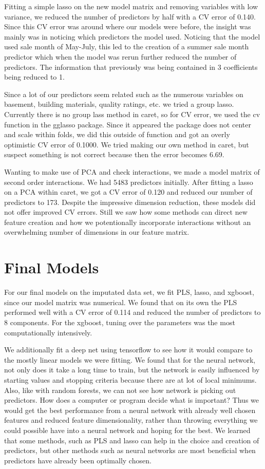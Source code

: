 \documentclass[12pt]{article}
\begin{document}
Fitting a simple lasso on the new model matrix and removing variables with low variance, we reduced the number of predictors by half with a CV error of 0.140.  Since this CV error was around where our models were before, the insight was mainly was in noticing which predictors the model used.  Noticing that the model used sale month of May-July, this led to the creation of a summer sale month predictor which when the model was rerun further reduced the number of predictors.  The information that previously was being contained in 3 coefficients being reduced to 1.

Since a lot of our predictors seem related such as the numerous variables on basement, building materials, quality ratings, etc. we tried a group lasso.  Currently there is no group lass method in caret, so for CV error, we used the cv function in the gglasso package.  Since it appeared the package does not center and scale within folds, we did this outside of function and got an overly optimistic CV error of 0.1000.  We tried making our own method in caret, but suspect something is not correct because then the error becomes 6.69.

Wanting to make use of PCA and check interactions, we made a model matrix of second order interactions.  We had 5483 predictors initially.  After fitting a lasso on a PCA within caret, we got a CV error of 0.120 and reduced our number of predictors to 173.  Despite the impressive dimension reduction, these models did not offer improved CV errors.  Still we saw how some methods can direct new feature creation and how we potentionally incorporate interactions without an overwhelming number of dimensions in our feature matrix.

\section{Final Models}

For our final models on the imputated data set, we fit PLS, lasso, and xgboost, since our model matrix was numerical.  We found that on its own the PLS performed well with a CV error of 0.114 and reduced the number of predictors to 8 components.  For the xgboost, tuning over the parameters was the most computationally intensively.

We additionally fit a deep net using tensorflow to see how it would compare to the mostly linear models we were fitting.  We found that for the neural network, not only does it take a long time to train, but the network is easily influenced by starting values and stopping criteria because there are at lot of local minimums.  Also, like with random forests, we can not see how network is picking out predictors.  How does a computer or program decide what is important?  Thus we would get the best performance from a neural network with already well chosen features and reduced feature dimensionality, rather than throwing everything we could possible have into a neural network and hoping for the best.  We learned that some methods, such as PLS and lasso can help in the choice and creation of predictors, but other methods such as neural networks are most beneficial when predictors have already been optimally chosen.
\end{document}
